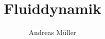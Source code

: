 %
%
%
\usepackage[utf8]{inputenc}
\usepackage[T1]{fontenc}
\usepackage{epic}
\usepackage{color}
\usepackage{array}
\usepackage{ifthen}
\usepackage{tikz}
\usepackage{wasysym}
\usepackage{lmodern}
\usetikzlibrary{shapes.geometric}
\beamertemplatenavigationsymbolsempty
\title[Fluiddynamik]{Fluiddynamik}
\author{Andreas Müller}
\date[]{}

